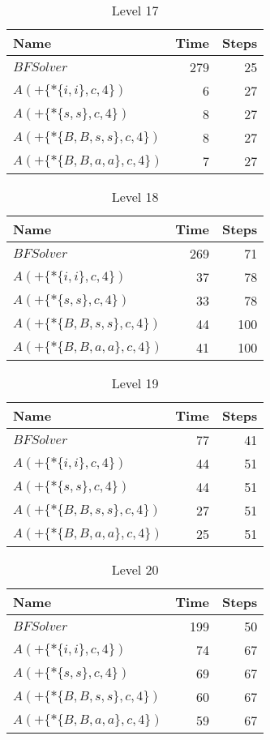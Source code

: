 \begin{table} \centering \begin{tabular}{lrr}\toprule \textbf{ Name }
    & \textbf{ Time } & \textbf{ Steps }\\\midrule
    $BFSolver$ & 279 & 25 \\
    $A(+\{*\{i,i\},c,4\})$ & 6 & 27 \\
    $A(+\{*\{s,s\},c,4\})$ & 8 & 27 \\
    $A(+\{*\{B,B,s,s\},c,4\})$ & 8 & 27 \\
    $A(+\{*\{B,B,a,a\},c,4\})$ & 7 & 27 \\
    \bottomrule \end{tabular} \caption{Level 17}
  \label{tab:level_17} \end{table}

\begin{table} \centering \begin{tabular}{lrr}\toprule \textbf{ Name }
    & \textbf{ Time } & \textbf{ Steps }\\\midrule
    $BFSolver$ & 269 & 71 \\
    $A(+\{*\{i,i\},c,4\})$ & 37 & 78 \\
    $A(+\{*\{s,s\},c,4\})$ & 33 & 78 \\
    $A(+\{*\{B,B,s,s\},c,4\})$ & 44 & 100 \\
    $A(+\{*\{B,B,a,a\},c,4\})$ & 41 & 100 \\
    \bottomrule \end{tabular} \caption{Level 18}
  \label{tab:level_18} \end{table}

\begin{table} \centering \begin{tabular}{lrr}\toprule \textbf{ Name }
    & \textbf{ Time } & \textbf{ Steps }\\\midrule
    $BFSolver$ & 77 & 41 \\
    $A(+\{*\{i,i\},c,4\})$ & 44 & 51 \\
    $A(+\{*\{s,s\},c,4\})$ & 44 & 51 \\
    $A(+\{*\{B,B,s,s\},c,4\})$ & 27 & 51 \\
    $A(+\{*\{B,B,a,a\},c,4\})$ & 25 & 51 \\
    \bottomrule \end{tabular} \caption{Level 19}
  \label{tab:level_19} \end{table}

\begin{table} \centering \begin{tabular}{lrr}\toprule \textbf{ Name }
    & \textbf{ Time } & \textbf{ Steps }\\\midrule
    $BFSolver$ & 199 & 50 \\
    $A(+\{*\{i,i\},c,4\})$ & 74 & 67 \\
    $A(+\{*\{s,s\},c,4\})$ & 69 & 67 \\
    $A(+\{*\{B,B,s,s\},c,4\})$ & 60 & 67 \\
    $A(+\{*\{B,B,a,a\},c,4\})$ & 59 & 67 \\
    \bottomrule \end{tabular} \caption{Level 20}
  \label{tab:level_20} \end{table}

